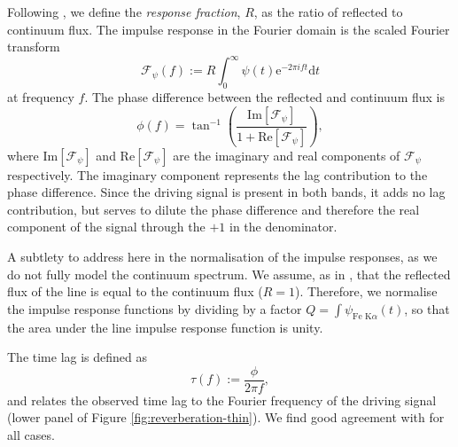 \documentclass[fleqn,usenatbib]{mnras}
\newcommand{\e}{\text{e}}
\renewcommand{\d}{\text{d}}
\renewcommand{\Im}[1]{\text{Im}\left[#1\right]}
\renewcommand{\Re}[1]{\text{Re}\left[#1\right]}
\begin{document}
Following \cite{cackett_modelling_2014}, we define the \textit{response
fraction}, $R$, as the ratio of reflected to continuum flux. The impulse response
in the Fourier domain is the scaled Fourier transform
\begin{equation}
    \mathscr{F}_\psi(f) := R \int_{0}^\infty \psi(t) \e^{-2\pi i f t} \d t
\end{equation}
at frequency $f$.
The phase difference between the reflected and continuum flux is
\begin{equation}
    \phi(f) = \tan^{-1} \left(
        \frac{\Im{\mathscr{F}_\psi}}{1 + \Re{\mathscr{F}_\psi}}
    \right),
\end{equation}
where $\Im{\mathscr{F}_\psi}$ and $\Re{\mathscr{F}_\psi}$ are the imaginary and
real components of $\mathscr{F}_\psi$ respectively. The imaginary component
represents the lag contribution to the phase difference. Since the driving
signal is present in both bands, it adds no lag contribution, but serves to
dilute the phase difference and therefore the real component of the signal
through the $+1$ in the denominator.

A subtlety to address here in the normalisation of the impulse responses, as we
do not fully model the continuum spectrum. We assume, as in
\cite{cackett_modelling_2014}, that the reflected flux of the line is equal to
the continuum flux ($R = 1$). Therefore, we normalise the impulse response
functions by dividing by a factor $Q = \int \psi_{\text{Fe K}\alpha}(t)$, so
that the area under the line impulse response function is unity.


The time lag is defined as
\begin{equation}
    \tau(f) := \frac{\phi}{2 \pi f},
\end{equation}
and relates the observed time lag to the Fourier frequency of the driving
signal (lower panel of Figure \ref{fig:reverberation-thin}).  We find good
agreement with \cite{cackett_modelling_2014} for all cases.
\end{document}
